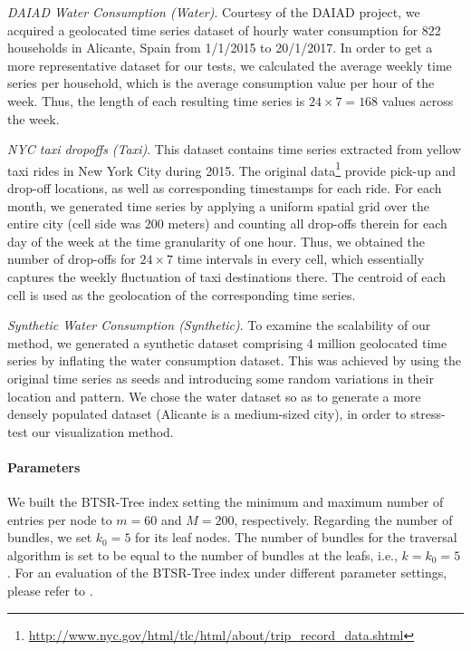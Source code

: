 \emph{DAIAD Water Consumption (Water)}. Courtesy of the DAIAD project, we acquired a geolocated time series dataset of hourly water consumption for 822 households in Alicante, Spain from 1/1/2015 to 20/1/2017. In order to get a more representative dataset for our tests, we calculated the average weekly time series per household, which is the average consumption value per hour of the week. Thus, the length of each resulting time series is $24 \times 7=168$ values across the week.

\emph{NYC taxi dropoffs (Taxi)}. This dataset contains time series extracted from yellow taxi rides in New York City during 2015. The original data\footnote{\url{http://www.nyc.gov/html/tlc/html/about/trip_record_data.shtml}} provide pick-up and drop-off locations, as well as corresponding timestamps for each ride. For each month, we generated time series by applying a uniform spatial grid over the entire city (cell side was 200 meters) and counting all drop-offs therein for each day of the week at the time granularity of one hour. Thus, we obtained the number of drop-offs for $24 \times 7$ time intervals in every cell, which essentially captures the weekly fluctuation of taxi destinations there. The centroid of each cell is used as the geolocation of the corresponding time series.

\emph{Synthetic Water Consumption (Synthetic)}. To examine the scalability of our method, we generated a synthetic dataset comprising 4 million geolocated time series by inflating the water consumption dataset. This was achieved by using the original time series as seeds and introducing some random variations in their location and pattern. We chose the water dataset so as to generate a more densely populated dataset (Alicante is a medium-sized city), in order to stress-test our visualization method.

\paragraph{Parameters}

We built the BTSR-Tree index setting the minimum and maximum number of entries per node to $m=60$ and $M=200$, respectively. Regarding the number of bundles, we set $k_0 = 5$ for its leaf nodes. The number of bundles for the traversal algorithm is set to be equal to the number of bundles at the leafs, i.e., $k = k_0 = 5$. For an evaluation of the BTSR-Tree index under different parameter settings, please refer to \cite{chatzig17btsr}.

